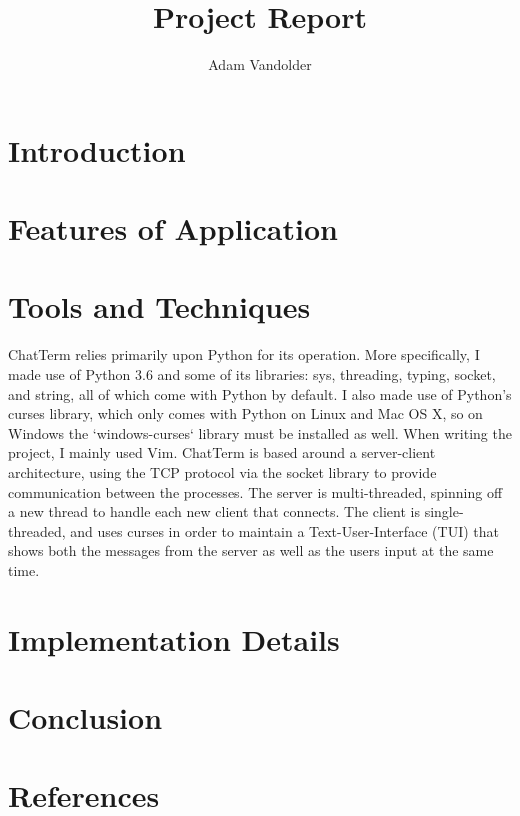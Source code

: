 \documentclass{article}
\title{Project Report}
\author{Adam Vandolder}
\date{}
\begin{document}
	\maketitle
    \tableofcontents
	\newpage

    \section{Introduction}
    \section{Features of Application}
    \section{Tools and Techniques}
    ChatTerm relies primarily upon Python for its operation.
    More specifically, I made use of Python 3.6 and some of its libraries: sys,
    threading, typing, socket, and string, all of which come with Python by
    default. I also made use of Python's curses library, which only comes with
    Python on Linux and Mac OS X, so on Windows the `windows-curses` library
    must be installed as well. When writing the project, I mainly used Vim.
    ChatTerm is based around a server-client architecture, using the TCP
    protocol via the socket library to provide communication between the
    processes. The server is multi-threaded, spinning off a new thread to handle
    each new client that connects. The client is single-threaded, and uses
    curses in order to maintain a Text-User-Interface (TUI) that shows both the
    messages from the server as well as the users input at the same time.
    \section{Implementation Details}
    \section{Conclusion}
    \section{References}
\end{document}
